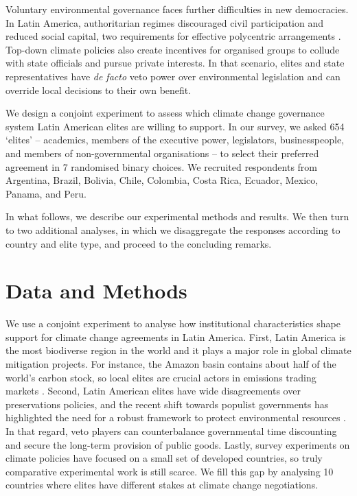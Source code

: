 \documentclass[a4paper,12pt]{article}
\begin{document}
Voluntary environmental governance faces further difficulties in new democracies. In Latin America, authoritarian regimes discouraged civil participation and reduced social capital, two requirements for effective polycentric arrangements \citep{aligica2014institutional,ostrom1990governing}. Top-down climate policies also create incentives for organised groups to collude with state officials and pursue private interests. In that scenario, elites and state representatives have \textit{de facto} veto power over environmental legislation and can override local decisions to their own benefit.

We design a conjoint experiment to assess which climate change governance system Latin American elites are willing to support. In our survey, we asked 654 `elites' -- academics, members of the executive power, legislators, businesspeople, and members of non-governmental organisations -- to select their preferred agreement in 7 randomised binary choices. We recruited respondents from Argentina, Brazil, Bolivia, Chile, Colombia, Costa Rica, Ecuador, Mexico, Panama, and Peru.

In what follows, we describe our experimental methods and results. We then turn to two additional analyses, in which we disaggregate the responses according to country and elite type, and proceed to the concluding remarks.

\section{Data and Methods}%
\label{sec:data_and_methods}

We use a conjoint experiment to analyse how institutional characteristics shape support for climate change agreements in Latin America. First, Latin America is the most biodiverse region in the world and it plays a major role in global climate mitigation projects. For instance, the Amazon basin contains about half of the world's carbon stock, so local elites are crucial actors in emissions trading markets \citep{yang2018post}. Second, Latin American elites have wide disagreements over preservations policies, and the recent shift towards populist governments has highlighted the need for a robust framework to protect environmental resources \citep{ellner2019pinktide}. In that regard, veto players can counterbalance governmental time discounting and secure the long-term provision of public goods. Lastly, survey experiments on climate policies have focused on a small set of developed countries, so truly comparative experimental work is still scarce. We fill this gap by analysing 10 countries where elites have different stakes at climate change negotiations.  
\end{document}
